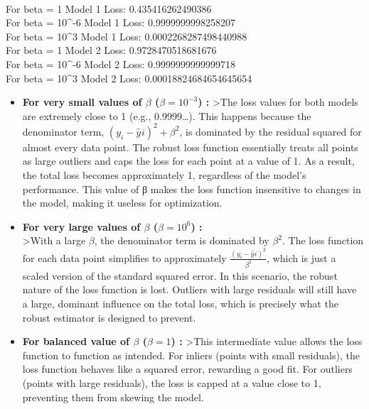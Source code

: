 \documentclass[11pt]{article}
\begin{document}
    \begin{center}
    \end{center}
    { \hspace*{\fill} \\}
    
    For beta = 1 Model 1 Loss: 0.435416262490386\\
For beta = 10\^{}-6 Model 1 Loss: 0.9999999998258207\\
For beta = 10\^{}3 Model 1 Loss: 0.0002268287498440988\\
For beta = 1 Model 2 Loss: 0.9728470518681676\\
For beta = 10\^{}-6 Model 2 Loss: 0.9999999999999718\\
For beta = 10\^{}3 Model 2 Loss: 0.00018824684654645654

    \begin{itemize}
\item
  \textbf{For very small values of \(\beta\) (\(\beta = 10^{-3}\)) :}
  \textgreater The loss values for both models are extremely close to 1
  (e.g., 0.9999\ldots). This happens because the denominator term,
  \((y_i​−\hat{y}_​i​)^2+β^2\), is dominated by the residual squared for
  almost every data point. The robust loss function essentially treats
  all points as large outliers and caps the loss for each point at a
  value of 1. As a result, the total loss becomes approximately 1,
  regardless of the model's performance. This value of β makes the loss
  function insensitive to changes in the model, making it useless for
  optimization.
\item
  \textbf{For very large values of \(\beta\) (\(\beta = 10^6\)) :}\\
  \textgreater With a large \(\beta\), the denominator term is dominated
  by \(\beta^2\). The loss function for each data point simplifies to
  approximately \(\frac{(y_i​−\hat{y}_​i​)^2}{\beta^2}​\), which is just a
  scaled version of the standard squared error. In this scenario, the
  robust nature of the loss function is lost. Outliers with large
  residuals will still have a large, dominant influence on the total
  loss, which is precisely what the robust estimator is designed to
  prevent.
\item
  \textbf{For balanced value of \(\beta\) (\(\beta = 1\)) :}
  \textgreater This intermediate value allows the loss function to
  function as intended. For inliers (points with small residuals), the
  loss function behaves like a squared error, rewarding a good fit. For
  outliers (points with large residuals), the loss is capped at a value
  close to 1, preventing them from skewing the model.
\end{itemize}
\end{document}
